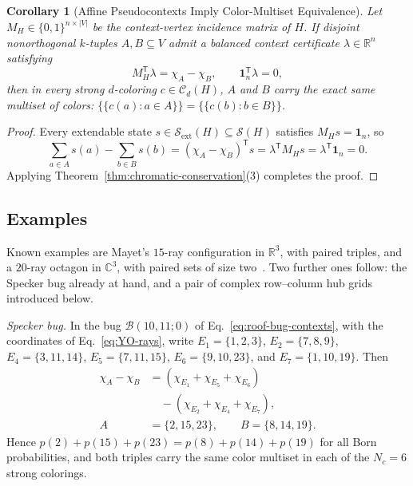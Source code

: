 \documentclass[aps,pra,reprint,superscriptaddress,longbibliography,nofootinbib,floatfix,10pt]{revtex4-2}
\newtheorem{corollary}[theorem]{Corollary}
\theoremstyle{definition}\newtheorem{definition}[theorem]{Definition}
\theoremstyle{remark}\newtheorem{remark}[theorem]{Remark}
\newcommand{\C}{\mathbb C}\newcommand{\R}{\mathbb R}\newcommand{\Q}{\mathbb Q}
\newcommand{\Sc}{\mathcal S}\newcommand{\Cc}{\mathcal C}\newcommand{\Wc}{\mathcal W}
\begin{document}
\begin{corollary}[Affine Pseudocontexts Imply Color-Multiset Equivalence]\label{cor:affine-to-chromatic}
Let $M_H\in\{0,1\}^{n\times |V|}$ be the context-vertex incidence matrix of $H$. If disjoint nonorthogonal $k$-tuples $A,B\subseteq V$ admit a balanced context certificate $\lambda\in\R^n$ satisfying~\cite{2026-Navara-Svozil-pseudocontexts}
\begin{equation}\label{eq:balanced-certificate}
M_H^{\mathsf T}\lambda = \chi_A - \chi_B,\qquad \mathbf{1}_n^{\mathsf T}\lambda = 0,
\end{equation}
then in every strong $d$-coloring $c\in\Cc_d(H)$, $A$ and $B$ carry the exact same multiset of colors: $\{\!\{c(a):a\in A\}\!\}=\{\!\{c(b):b\in B\}\!\}$.
\end{corollary}
\begin{proof}
Every extendable state $s\in\Sc_{\mathrm{ext}}(H)\subseteq\Sc(H)$ satisfies $M_H s=\mathbf{1}_n$, so
\[
\sum_{a\in A}s(a)-\sum_{b\in B}s(b)=(\chi_A-\chi_B)^{\mathsf T}s=\lambda^{\mathsf T}M_H s=\lambda^{\mathsf T}\mathbf{1}_n=0.
\]
Applying Theorem~\ref{thm:chromatic-conservation}(3) completes the proof.
\end{proof}

\subsection{Examples}\label{sec:B13-R21}
Known examples are Mayet's $15$-ray configuration in $\R^3$, with paired triples, and a $20$-ray octagon in $\C^3$, with paired sets of size two~\cite{Navara_1995,Mayet_2000,2023-navara-svozil,2026-Navara-Svozil-pseudocontexts}. Two further ones follow: the Specker bug already at hand, and a pair of complex row--column hub grids introduced below.

\emph{Specker bug.} In the bug $\mathcal B(10,11;0)$ of Eq.~\eqref{eq:roof-bug-contexts}, with the coordinates of Eq.~\eqref{eq:YO-rays}, write $E_1=\{1,2,3\}$, $E_2=\{7,8,9\}$, $E_4=\{3,11,14\}$, $E_5=\{7,11,15\}$, $E_6=\{9,10,23\}$, and $E_7=\{1,10,19\}$. Then
\begin{equation}\label{eq:B13-paired3}
\begin{aligned}
\chi_A-\chi_B&=(\chi_{E_1}+\chi_{E_5}+\chi_{E_6})\\
&\quad-(\chi_{E_2}+\chi_{E_4}+\chi_{E_7}),\\
A&=\{2,15,23\},\qquad B=\{8,14,19\}.
\end{aligned}
\end{equation}
Hence $p(2)+p(15)+p(23)=p(8)+p(14)+p(19)$ for all Born probabilities, and both triples carry the same color multiset in each of the $N_c=6$ strong colorings.
\end{document}
